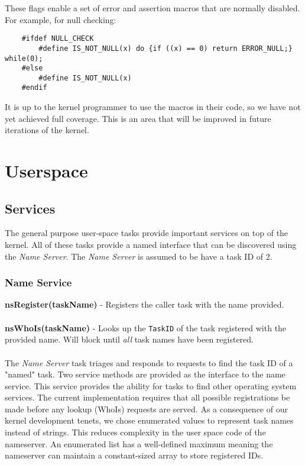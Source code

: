 \documentclass[twoside,a4paper]{refart}
\begin{document}
These flags enable a set of error and assertion macros that are normally disabled. For example, for null checking:

\begin{verbatim}
    #ifdef NULL_CHECK
        #define IS_NOT_NULL(x) do {if ((x) == 0) return ERROR_NULL;} while(0);
    #else
        #define IS_NOT_NULL(x)
    #endif
\end{verbatim}

It is up to the kernel programmer to use the macros in their code, so we have not yet achieved full coverage. This is an area that will be improved in future iterations of the kernel.
\section{Userspace}
\subsection{Services}
The general purpose user-space tasks provide important services on top of the kernel. All of these tasks provide a named interface that can be discovered using the \textit{Name Server}. The \textit{Name Server} is assumed to be have a task ID of 2.

\subsubsection{Name Service}

\textbf{nsRegister(taskName)} - Registers the caller task with the name provided.\\\\
\textbf{nsWhoIs(taskName)} - Looks up the \verb~TaskID~ of the task registered with the provided name. Will block until \textit{all} task names have been registered.\\\\

The \textit{Name Server} task triages and responds to requests to find the task ID of a "named" task. Two service methods are provided as the interface to the name service. This service provides the ability for tasks to find other operating system services. The current implementation requires that all possible registrations be made before any lookup (WhoIs) requests are served. As a consequence of our kernel development tenets, we chose enumerated values to represent task names instead of strings. This reduces complexity in the user space code of the nameserver. An enumerated list has a well-defined maximum meaning the nameserver can maintain a constant-sized array to store registered IDs.
\end{document}
